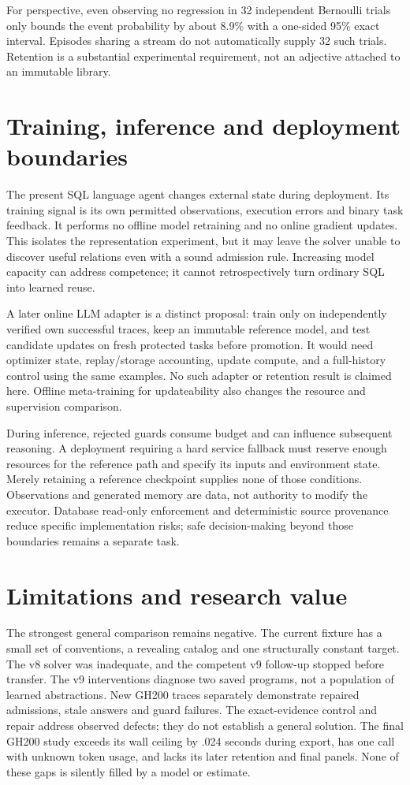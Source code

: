 \documentclass[10pt,twocolumn]{article}
\begin{document}
For perspective, even observing no regression in 32 independent Bernoulli
trials only bounds the event probability by about 8.9\% with a one-sided 95\%
exact interval. Episodes sharing a stream do not automatically supply 32 such
trials. Retention is a substantial experimental requirement, not an adjective
attached to an immutable library.

\section{Training, inference and deployment boundaries}
The present SQL language agent changes external state during deployment. Its training
signal is its own permitted observations, execution errors and binary task
feedback. It performs no offline model retraining and no online gradient
updates. This isolates the representation experiment, but it may leave the
solver unable to discover useful relations even with a sound admission rule.
Increasing model capacity can address competence; it cannot retrospectively
turn ordinary SQL into learned reuse.

A later online LLM adapter is a distinct proposal: train only on independently
verified own successful traces, keep an immutable reference model, and test
candidate updates on fresh protected tasks before promotion. It would need
optimizer state, replay/storage accounting, update compute, and a full-history
control using the same examples. No such adapter or retention result is claimed
here. Offline meta-training for updateability also changes the resource and
supervision comparison.

During inference, rejected guards consume budget and can influence subsequent
reasoning. A deployment requiring a hard service fallback must reserve enough
resources for the reference path and specify its inputs and environment state.
Merely retaining a reference checkpoint supplies none of those conditions.
Observations and generated memory are data, not authority to modify the executor.
Database read-only enforcement and deterministic source provenance reduce
specific implementation risks; safe decision-making beyond those boundaries
remains a separate task.

\section{Limitations and research value}
The strongest general comparison remains negative. The current fixture has a
small set of conventions, a revealing catalog and one structurally constant
target. The v8 solver was inadequate, and the competent v9 follow-up stopped
before transfer. The v9 interventions diagnose two saved programs, not a
population of learned abstractions. New GH200 traces separately demonstrate
repaired admissions, stale answers and guard failures. The exact-evidence
control and repair address observed defects; they do not establish a general
solution. The final GH200 study exceeds its wall ceiling by .024 seconds during
export, has one call with unknown token usage, and lacks its later retention
and final panels. None of these gaps is silently filled by a model or estimate.
\end{document}

